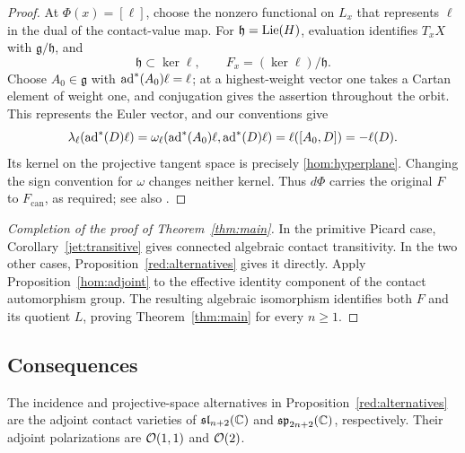 \begin{proof}
At $\Phi(x)=[\ell]$, choose the nonzero functional on $L_x$ that
represents $\ell$ in the dual of the contact-value map. For
$\mathfrak h=\operatorname{Lie}(H)$, evaluation identifies $T_xX$ with
$\mathfrak g/\mathfrak h$, and
\begin{equation}\label{hom:hyperplane}
 \mathfrak h\subset\ker\ell,\qquad
 F_x=(\ker\ell)/\mathfrak h.
\end{equation}
Choose $A_0\in\mathfrak g$ with $\operatorname{ad}^*(A_0)\ell=\ell$; at a
highest-weight vector one takes a Cartan element of weight one,
and conjugation gives the assertion throughout the orbit. This
represents the Euler vector, and our conventions give
\[
 \lambda_\ell(\operatorname{ad}^*(D)\ell)
 =\omega_\ell(\operatorname{ad}^*(A_0)\ell,\operatorname{ad}^*(D)\ell)
 =\ell([A_0,D])=-\ell(D).
\]
Its kernel on the projective tangent space is precisely
\eqref{hom:hyperplane}. Changing the sign convention for $\omega$
changes neither kernel. Thus $d\Phi$ carries the original $F$ to
$F_{\mathrm{can}}$, as required; see also
\cite[Remark~2.3]{Beauville1998}.
\end{proof}

\begin{proof}[Completion of the proof of Theorem~\ref{thm:main}]
In the primitive Picard case, Corollary~\ref{jet:transitive} gives
connected algebraic contact transitivity. In the two other cases,
Proposition~\ref{red:alternatives} gives it directly. Apply
Proposition~\ref{hom:adjoint} to the effective identity component
of the contact automorphism group. The resulting algebraic
isomorphism identifies both $F$ and its quotient $L$, proving
Theorem~\ref{thm:main} for every $n\geq1$.
\end{proof}

\subsection{Consequences}

\begin{corollary}\label{hom:models}
The incidence and projective-space alternatives in
Proposition~\ref{red:alternatives} are the adjoint contact varieties
of $\mathfrak{sl}_{n+2}(\mathbb C)$ and
$\mathfrak{sp}_{2n+2}(\mathbb C)$, respectively. Their adjoint
polarizations are $\mathcal O(1,1)$ and $\mathcal O(2)$.
\end{corollary}

